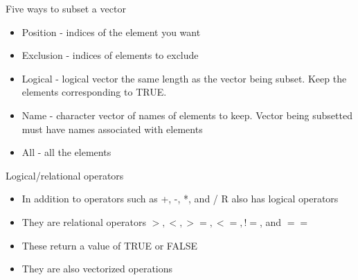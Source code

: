 \documentclass{beamer}\usepackage[]{graphicx}\usepackage[]{color}
\theoremstyle{mystyle}
\begin{document}
\begin{frame}[fragile]{Five ways to subset a vector}
\begin{itemize}
\item Position - indices of the element you want
\item Exclusion - indices of elements to exclude 
\item Logical - logical vector the same length as the vector being subset. Keep the elements corresponding to TRUE. 
\item Name - character vector of names of elements to keep. Vector being subsetted must have names associated with elements
\item All - all the elements
\end{itemize}
\end{frame}


\begin{frame}[fragile]{Logical/relational operators}
\begin{itemize}
\item In addition to operators such as +, -, *, and /  R also has logical operators
\item They are relational operators                          $>, <, >=, <=, !=$, and $==$
\item These return a value of TRUE or FALSE
\item They are also vectorized operations
\end{itemize}
\end{frame}
\end{document}
